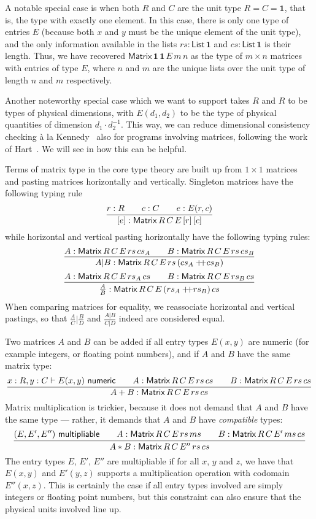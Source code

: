\documentclass{ws-procs9x6}
\newcommand{\isadd}[1]{#1\ \textsf{numeric}}
\newcommand{\ismult}[3]{(#1, #2, #3)\ \textsf{multipliable}}
\newcommand{\append}{+\!\!\!+}
\newcommand{\hjux}[2]{{#1}|{#2}}
\newcommand{\vjux}[2]{\frac{#1}{#2}}
\newcommand{\One}{\mathbf{1}}
\newcommand{\Matrix}[5]{\mathsf{Matrix}\,#1\,#2\,#3\,#4\,#5}
\newcommand{\List}[1]{\mathsf{List}\,#1}
\newcommand{\remph}{\emph}
\begin{document}
A notable special case is when both $R$ and $C$ are the unit type
$R = C = \One$, that is, the type with exactly one element.
%
In this case, there is only one type of entries $E$ (because both $x$
and $y$ must be the unique element of the unit type), and the only
information available in the lists $rs : \List{\One}$ and
$cs : \List{\One}$ is their length.
%
Thus, we have recovered $\Matrix{\One}{\One}{E}{m}{n}$ as the type of
$m \times n$ matrices with entries of type $E$, where $n$ and $m$ are
the unique lists over the unit type of length $n$ and $m$
respectively.

Another noteworthy special case which we want to support takes $R$ and
$R$ to be types of physical dimensions, with $E(d_1, d_2)$ to be the
type of physical quantities of dimension $d_1 \cdot d_2^{-1}$.
%
This way, we can reduce dimensional consistency checking \`a la
Kennedy~\cite{kennedyUOM} also for programs involving matrices,
following the work of Hart~\cite{hart}.
%
We will see in  how this can be helpful.

Terms of matrix type in the core type theory are built up from
$1 \times 1$ matrices and pasting matrices horizontally and vertically.
%
Singleton matrices have the following typing rule
\[
  \infer{[e] : \Matrix{R}{C}{E}{[r]}{[c]}}
    {r : R
      &\quad
      c : C
      &\quad
      e : E(r, c)
    }
\]
%
while horizontal and vertical pasting horizontally have the following
typing rules:
\[
  \infer{\hjux{A}{B} : \Matrix{R}{C}{E}{rs}{(cs_A \append cs_B)}}
  {
    A : \Matrix{R}{C}{E}{rs}{cs_A}
    &\quad
    B : \Matrix{R}{C}{E}{rs}{cs_B}
  }
\]
\[
  \infer{\vjux{A}{B} : \Matrix{R}{C}{E}{(rs_A \append rs_B)}{cs}}
  {
    A : \Matrix{R}{C}{E}{rs_A}{cs}
    &\quad
    B : \Matrix{R}{C}{E}{rs_B}{cs}
  }
\]
When comparing matrices for equality, we reassociate horizontal and
vertical pastings, so that $\hjux{\vjux{A}{C}}{\vjux{B}{D}}$ and
$\vjux{\hjux{A}{B}}{\hjux{C}{D}}$ indeed are considered equal.

Two matrices $A$ and $B$ can be added if all entry types $E(x, y)$ are
numeric (for example integers, or floating point numbers), and if $A$
and $B$ have the same matrix type:
%
\[
  \infer{A + B : \Matrix{R}{C}{E}{rs}{cs}}
  {
    x : R, y : C \vdash \isadd{E(x, y)}
    &\quad
    A : \Matrix{R}{C}{E}{rs}{cs}
    &\quad
    B : \Matrix{R}{C}{E}{rs}{cs}
  }
\]
%
Matrix multiplication is trickier, because it does not demand that $A$
and $B$ have the same type --- rather, it demands that $A$ and $B$
have \remph{compatible} types:
%
\[
  \infer{A * B : \Matrix{R}{C}{E''}{rs}{cs}}
  {
    \ismult{E}{E'}{E''}
    &\quad
    A : \Matrix{R}{C}{E}{rs}{ms}
    &\quad
    B : \Matrix{R}{C}{E'}{ms}{cs}
  }
\]
The entry types $E$, $E'$, $E''$ are multipliable if for all $x$, $y$
and $z$, we have that $E(x, y)$ and $E'(y, z)$ supports a
multiplication operation with codomain $E''(x, z)$.
%
This is certainly the case if all entry types involved are simply
integers or floating point numbers, but this constraint can also
ensure that the physical units involved line up.
\end{document}
